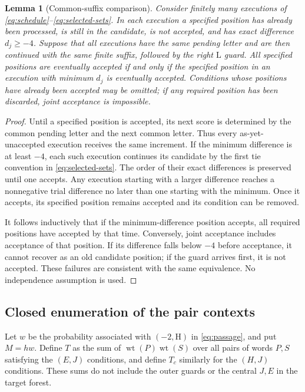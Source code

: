 \documentclass[11pt,a4paper]{article}
\newtheorem{lemma}[theorem]{Lemma}
\theoremstyle{definition}
\theoremstyle{remark}
\newcommand{\wt}{\operatorname{wt}}
\newcommand{\HH}{\mathrm H}
\newcommand{\LL}{\mathrm L}
\begin{document}
\begin{lemma}[Common-suffix comparison]\label{lem:common-suffix}
Consider finitely many executions of \eqref{eq:schedule}--\eqref{eq:selected-sets}. In each execution a specified position has already been processed, is still in the candidate, is not accepted, and has exact difference $d_j\ge-4$. Suppose that all executions have the same pending letter and are then continued with the same finite suffix, followed by the right $\LL$ guard. All specified positions are eventually accepted if and only if the specified position in an execution with minimum $d_j$ is eventually accepted. Conditions whose positions have already been accepted may be omitted; if any required position has been discarded, joint acceptance is impossible.
\end{lemma}
\begin{proof}
Until a specified position is accepted, its next score is determined by the common pending letter and the next common letter. Thus every as-yet-unaccepted execution receives the same increment. If the minimum difference is at least $-4$, each such execution continues its candidate by the first tie convention in \eqref{eq:selected-sets}. The order of their exact differences is preserved until one accepts. Any execution starting with a larger difference reaches a nonnegative trial difference no later than one starting with the minimum. Once it accepts, its specified position remains accepted and its condition can be removed.

It follows inductively that if the minimum-difference position accepts, all required positions have accepted by that time. Conversely, joint acceptance includes acceptance of that position. If its difference falls below $-4$ before acceptance, it cannot recover as an old candidate position; if the guard arrives first, it is not accepted. These failures are consistent with the same equivalence. No independence assumption is used.
\end{proof}

\subsection{Closed enumeration of the pair contexts}\label{sec:paircounts}
Let $w$ be the probability associated with $(-2,\HH)$ in \eqref{eq:passage}, and put $M=hw$. Define $T$ as the sum of $\wt(P)\wt(S)$ over all pairs of words $P,S$ satisfying the $(E,J)$ conditions, and define $T_c$ similarly for the $(H,J)$ conditions. These sums do not include the outer guards or the central $J,E$ in the target forest.
\end{document}
